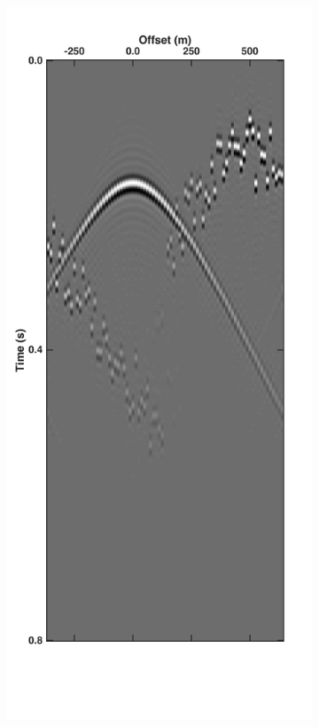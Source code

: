 \begin{figure}
\begin{subfigure}[b]{0.3\textwidth}
		\caption{}
		\label{fig:Ch-Theory-PseudoCRG-CoherentDelay}
	\end{subfigure}
	\centering
	\begin{subfigure}[b]{0.3\textwidth}
		\centering
		\includegraphics[width = \textwidth]{Plots/Mahdad/25iter/TimeDelay/Pseudo-DeblendedCRG_rec30}
		\caption{}
		\label{fig:Ch-Theory-PseudoCRG-IncoherentDelay}
	\end{subfigure}
	\centering
	\begin{subfigure}[b]{0.3\textwidth}
	

\end{subfigure}
\end{figure}
